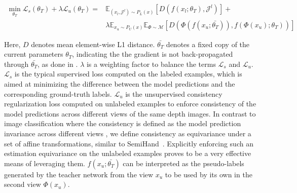 \documentclass{article}
\begin{document}
\begin{equation}
\label{eqn:teacher}
\begin{split}
  \min_{\theta_T} \mathcal{L}_{s}(\theta_T) + \lambda \mathcal{L}_{u}(\theta_T) =&  \mathbb{E}_{(x_l,\mathcal{J}^l)\sim P_L(x)}[D(f(x_l ;\theta_T),\mathcal{J}^l)] + \\
 & \lambda \mathbb{E}_{x_u\sim P_U(x)}\mathbb{E}_{\Phi\sim \mathcal{M}}[D(\Phi(f(x_u ;\bar{\theta_T})),f(\Phi(x_u) ;\theta_T))] 
\end{split}
\end{equation}

Here, $D$ denotes mean element-wise L1 distance. $\bar{\theta_T}$ denotes a fixed copy of the current parameters $\theta_T$, indicating the the gradient is not back-propagated through $\bar{\theta_T}$, as done in \cite{xie2019unsupervised,miyato2018virtual}. $\lambda$ is a weighting factor to balance the terms $\mathcal{L}_{s}$ and $\mathcal{L}_{u}$. $\mathcal{L}_{s}$ is the typical supervised loss computed on the labeled examples, which is aimed at minimizing the difference between the model predictions and the corresponding ground-truth labels. $\mathcal{L}_{u}$ is the unsupervised consistency regularization loss computed on unlabeled examples to enforce consistency of the model predictions across different views of the same depth images. In contrast to image classification where the consistency is defined as the model prediction invariance across different views \cite{xie2019unsupervised}, we define consistency as equivariance under a set of affine transformations, similar to SemiHand~\cite{yang2021semihand}. Explicitly enforcing such an estimation equivariance on the unlabeled examples proves to be a very effective means of leveraging them. $f(x_u ;\bar{\theta_T})$ can be interpreted as the pseudo-labels generated by the teacher network from the view $x_u$ to be used by its own in the second view $\Phi(x_u)$.
\end{document}
